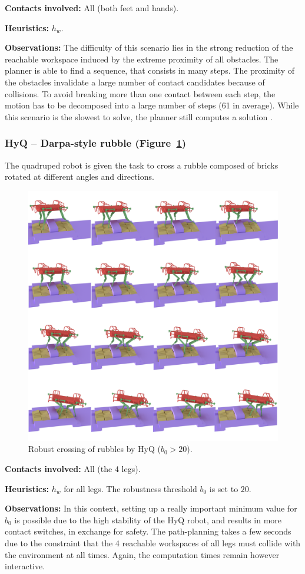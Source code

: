 \noindent\textbf{Contacts involved:} All (both feet and hands).

\noindent\textbf{Heuristics:} $h_w$.

\noindent\textbf{Observations:} The difficulty of this scenario lies in the strong reduction of the reachable workspace induced 
by the extreme proximity of all obstacles. The planner is able to find a sequence, that consists in many steps.
The proximity of the obstacles invalidate a large number of contact candidates because of collisions. To avoid breaking more than one contact between each step, the motion has to be decomposed into a large number of steps (61 in average).
While this scenario is the slowest to solve, the planner still computes a solution .


\subsubsection{HyQ -- Darpa-style rubble (Figure~\ref{fig:darpa})}
The quadruped robot is given the task to cross a rubble composed of bricks rotated at different angles and directions.

\begin{figure}
  \centering
  \includegraphics[width=0.5\linewidth]{figures/darpa}
  \caption{
           Robust crossing of rubbles by HyQ ($b_0 > 20$). }
		   \label{fig:darpa}
\end{figure}


\noindent\textbf{Contacts involved:} All (the 4 legs).

\noindent\textbf{Heuristics:} $h_w$ for all legs. The robustness threshold $b_0$ is set to $20$.

\noindent\textbf{Observations:} In this context, setting up a really important minimum value for $b_0$ is possible due to the high
stability of the HyQ robot, and results in more contact switches, in exchange for safety. The path-planning takes a few seconds due to the constraint that the 4 reachable workspaces of all legs must
collide with the environment at all times. %
Again, the computation times remain however \gls{interactive}.

